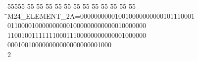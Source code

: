 %
%
\begin{tabbing}
55555 \= 55 \= 55 \= 55 \= 55 \= 55 \= 55 \= 55 \= 55 \= 55 \= 55 \= 55 \= 55 \= \>M24\_ELEMENT\_2A=000000000010010000000000101110001\\[0pt]
\>0110000100000000001000000000000010000000\\[0pt]
1100100111111100011100000000000001000000\\[0pt]
\>000100100000000000000000001000\\[0pt]
2\>\end{tabbing}

